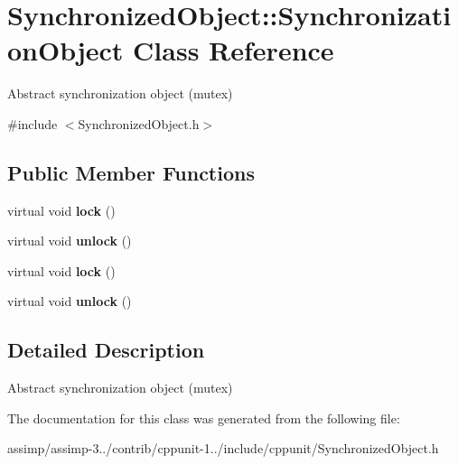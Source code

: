 \hypertarget{class_synchronized_object_1_1_synchronization_object}{\section{Synchronized\+Object\+:\+:Synchronization\+Object Class Reference}
\label{class_synchronized_object_1_1_synchronization_object}
}


Abstract synchronization object (mutex)  




{\ttfamily \#include $<$Synchronized\+Object.\+h$>$}

\subsection*{Public Member Functions}
\begin{DoxyCompactItemize}
\item 
\hypertarget{class_synchronized_object_1_1_synchronization_object_a2c1a4b7e3e3a8f8993140fb1fc9dabe0}{virtual void {\bfseries lock} ()}\label{class_synchronized_object_1_1_synchronization_object_a2c1a4b7e3e3a8f8993140fb1fc9dabe0}

\item 
\hypertarget{class_synchronized_object_1_1_synchronization_object_a2af2a59901a0cdc673dc8729840fe797}{virtual void {\bfseries unlock} ()}\label{class_synchronized_object_1_1_synchronization_object_a2af2a59901a0cdc673dc8729840fe797}

\item 
\hypertarget{class_synchronized_object_1_1_synchronization_object_a2c1a4b7e3e3a8f8993140fb1fc9dabe0}{virtual void {\bfseries lock} ()}\label{class_synchronized_object_1_1_synchronization_object_a2c1a4b7e3e3a8f8993140fb1fc9dabe0}

\item 
\hypertarget{class_synchronized_object_1_1_synchronization_object_a2af2a59901a0cdc673dc8729840fe797}{virtual void {\bfseries unlock} ()}\label{class_synchronized_object_1_1_synchronization_object_a2af2a59901a0cdc673dc8729840fe797}

\end{DoxyCompactItemize}


\subsection{Detailed Description}
Abstract synchronization object (mutex) 

The documentation for this class was generated from the following file\+:\begin{DoxyCompactItemize}
\item 
assimp/assimp-\/3../contrib/cppunit-\/1../include/cppunit/Synchronized\+Object.\+h\end{DoxyCompactItemize}
